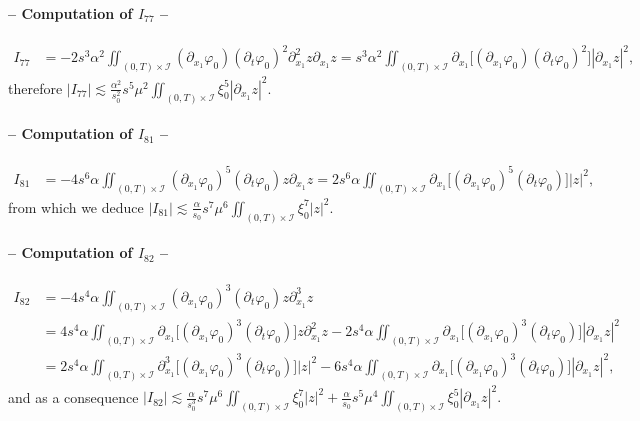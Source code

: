 \documentclass[a4paper, 12pt]{article}
\theoremstyle{plain}
\theoremstyle{definition}
\numberwithin{theorem}{section}
\numberwithin{equation}{section}
\begin{document}
{\paragraph{-- Computation of $I_{77}$ --}
\begin{align*}
I_{77}&=-2s^3\alpha^2\iint_{(0,T)\times\mathcal{I}}(\partial_{x_1}\varphi_0)(\partial_t\varphi_0)^2\partial^2_{x_1}z\partial_{x_1}z=s^3\alpha^2\iint_{(0,T)\times\mathcal{I}}\partial_{x_1}\big[(\partial_{x_1}\varphi_0)(\partial_t\varphi_0)^2\big]|\partial_{x_1}z|^2,\end{align*}
therefore $\displaystyle |I_{77}| \lesssim \frac{\alpha^2}{s_0^2} s^5\mu^2\iint_{(0,T)\times\mathcal{I}}\xi_0^5|\partial_{x_1}z|^2.$

\paragraph{-- Computation of $I_{81}$ --}
\begin{align*}
I_{81}&=-4s^6\alpha\iint_{(0,T)\times\mathcal{I}}(\partial_{x_1}\varphi_0)^5(\partial_t\varphi_0)z\partial_{x_1}z=2s^6\alpha\iint_{(0,T)\times\mathcal{I}}\partial_{x_1}\big[(\partial_{x_1}\varphi_0)^5(\partial_t\varphi_0)\big]|z|^2,\end{align*}
from which we deduce
$\displaystyle |I_{81}| \lesssim \frac{\alpha}{s_0} s^7\mu^6\iint_{(0,T)\times\mathcal{I}}\xi_0^7|z|^2.$

\paragraph{-- Computation of $I_{82}$ --}
\begin{align*}
I_{82}&=-4s^4\alpha\iint_{(0,T)\times\mathcal{I}}(\partial_{x_1}\varphi_0)^3(\partial_t\varphi_0)z\partial^3_{x_1}z\\
&=4s^4\alpha\iint_{(0,T)\times\mathcal{I}}\partial_{x_1}\big[(\partial_{x_1}\varphi_0)^3(\partial_t\varphi_0)\big]z\partial^2_{x_1}z-2s^4\alpha\iint_{(0,T)\times\mathcal{I}}\partial_{x_1}\big[(\partial_{x_1}\varphi_0)^3(\partial_t\varphi_0)\big]|\partial_{x_1}z|^2\\
&=2s^4\alpha\iint_{(0,T)\times\mathcal{I}}\partial^3_{x_1}\big[(\partial_{x_1}\varphi_0)^3(\partial_t\varphi_0)\big]|z|^2-6s^4\alpha\iint_{(0,T)\times\mathcal{I}}\partial_{x_1}\big[(\partial_{x_1}\varphi_0)^3(\partial_t\varphi_0)\big]|\partial_{x_1}z|^2,\end{align*}
and as a consequence
$\displaystyle |I_{82}| \lesssim \frac{\alpha}{s_0^3} s^7\mu^6\iint_{(0,T)\times\mathcal{I}}\xi_0^7|z|^2+\frac{\alpha}{s_0} s^5\mu^4\iint_{(0,T)\times\mathcal{I}}\xi_0^5|\partial_{x_1}z|^2.$

}
\end{document}
